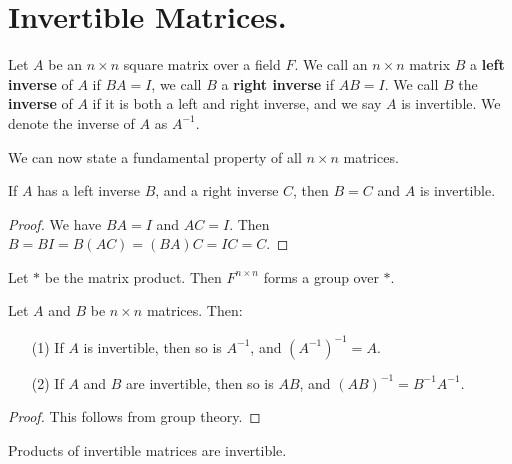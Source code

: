 
\section{Invertible Matrices.}
\label{section1}

\begin{definition}
    Let $A$ be an  $n \times n$ square matrix over a field  $F$. We call an $n \times n$ matrix  $B$
    a  \textbf{left inverse} of $A$ if  $BA=I$, we call  $B$ a \textbf{right inverse} if $AB=I$. We    
    call  $B$ the  \textbf{inverse} of $A$ if it is both a left and right inverse, and we say $A$ is
    invertible. We denote the inverse of  $A$ as  $A^{-1}$.
\end{definition}

We can now state a fundamental property of all $n \times n$ matrices.

\begin{lemma}\label{1.5.1}
    If $A$ has a left inverse  $B$, and a right inverse  $C$, then  $B=C$ and  $A$ is invertible.
\end{lemma}
\begin{proof}
    We have $BA=I$ and  $AC=I$. Then  $B=BI=B(AC)=(BA)C=IC=C$.
\end{proof}

\begin{theorem}\label{1.5.2}
    Let $\ast$ be the matrix product. Then  $F^{n \times n}$ forms a group over $\ast$.
\end{theorem}
\begin{corollary}
    Let $A$ and  $B$ be  $n \times n$ matrices. Then:
    \begin{enumerate}
        \item[(1)] If $A$ is invertible, then so is  $A^{-1}$, and $(A^{-1})^{-1}=A$.		

        \item[(2)] If $A$ and $B$ are invertible, then so is $AB$, and
            $(AB)^{-1}=B^{-1}A^{-1}$.
    \end{enumerate}		
\end{corollary}
\begin{proof}
    This follows from group theory.
\end{proof}

\begin{corollary}
    Products of invertible matrices are invertible.
\end{corollary}

